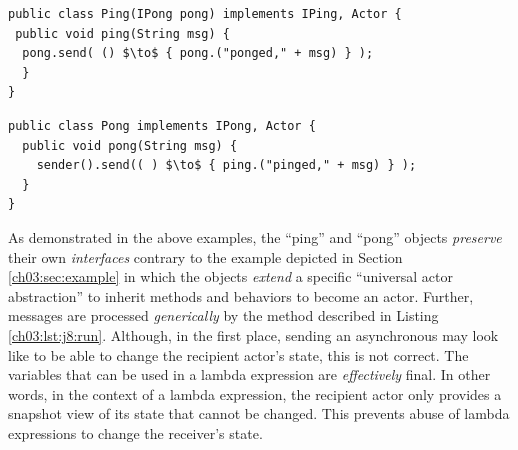 \begin{center}
\begin{minipage}[t]{0.48\textwidth}
\begin{lstlisting}[mathescape, caption=Ping as an Actor,label=lst:ping]
public class Ping(IPong pong) implements IPing, Actor {
 public void ping(String msg) {
  pong.send( () $\to$ { pong.("ponged," + msg) } );
  }
}
\end{lstlisting}
\end{minipage}
\hfill
\begin{minipage}[t]{0.48\textwidth}
\begin{lstlisting}[mathescape, caption=Pong as an Actor,label=lst:pong]
public class Pong implements IPong, Actor {
  public void pong(String msg) {
    sender().send(( ) $\to$ { ping.("pinged," + msg) } );
  }
}
\end{lstlisting}
\end{minipage}
\end{center}

% 
As demonstrated in the above examples, the ``ping'' and ``pong'' objects \emph{preserve} 
their own \emph{interfaces}  contrary to the example depicted in Section \ref{ch03:sec:example} 
in which the objects \emph{extend} a specific ``universal actor abstraction'' to inherit methods and behaviors to become an actor.
Further,  messages are processed \emph{generically} by the  method described in Listing \ref{ch03:lst:j8:run}.
Although, in the first place, sending an asynchronous may look like to be able to change the recipient actor's state, this is not correct.
The variables that can be used in a lambda expression are \emph{effectively} final. 
In other words, in the context of a lambda expression, the recipient actor only provides a snapshot view of its state that cannot be changed.
This prevents abuse of lambda expressions to change the receiver's state.

% 

